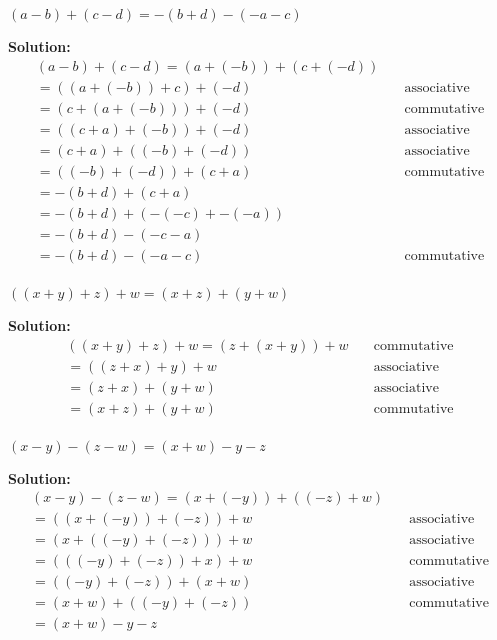 \begin{tcolorbox}[title=Problem 7, breakable]
$(a - b) + (c - d) = -(b + d) - (-a - c)$
\end{tcolorbox}

\textbf{Solution:}
\begin{align*}
(a - b) + (c - d) = (a + (-b)) + (c + (-d)) & \quad \text{} \\
=((a + (-b)) + c) + (-d) & \quad \text{associative} \\
=(c + (a + (-b))) + (-d) & \quad \text{commutative} \\
=((c + a) + (-b)) + (-d) & \quad \text{associative} \\
=(c + a) + ((-b) + (-d)) & \quad \text{associative} \\
=((-b) + (-d)) + (c + a) & \quad \text{commutative} \\
=-(b + d) + (c + a) & \quad \text{} \\
=-(b + d) + (-(-c) + -(-a)) & \quad \text{} \\
=-(b + d) - (-c - a) & \quad \text{} \\
=-(b + d) - (-a - c) & \quad \text{commutative} \\
\end{align*}

\begin{tcolorbox}[title=Problem 8, breakable]
$((x + y) + z) + w = (x + z) + (y + w)$
\end{tcolorbox}

\textbf{Solution:}
\begin{align*}
((x + y) + z) + w  = (z + (x + y)) + w & \quad \text{commutative} \\
=((z + x) + y) + w & \quad \text{associative} \\
=(z + x) + (y + w) & \quad \text{associative} \\
=(x + z) + (y + w) & \quad \text{commutative} \\
\end{align*}


\begin{tcolorbox}[title=Problem 9, breakable]
$(x - y) - (z - w) = (x + w) - y - z$
\end{tcolorbox}

\textbf{Solution:}
\begin{align*}
(x - y) - (z - w)  = (x + (-y)) + ((-z) + w)  & \quad \text{} \\
=((x + (-y)) + (-z)) + w & \quad \text{associative} \\
=(x + ((-y) + (-z))) + w & \quad \text{associative} \\
=(((-y) + (-z)) + x) + w & \quad \text{commutative} \\
=((-y) + (-z)) + (x + w) & \quad \text{associative} \\
=(x + w) + ((-y) + (-z)) & \quad \text{commutative} \\
=(x + w) - y - z & \quad \text{} \\
\end{align*}

